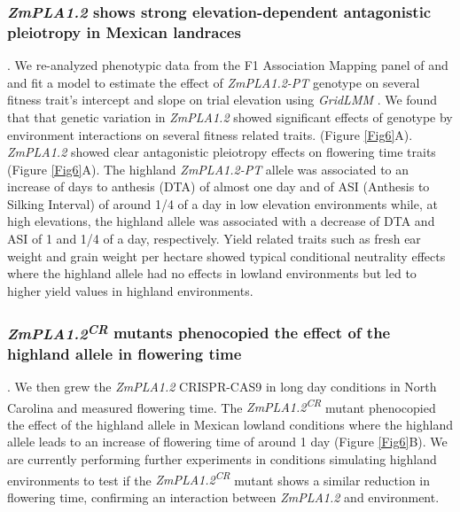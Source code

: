 \documentclass[9pt,twocolumn,twoside,lineno]{BioRxiv}
\begin{document}
\subsubsection{\textit{ZmPLA1.2} shows strong elevation-dependent antagonistic pleiotropy in Mexican landraces}. 
We re-analyzed phenotypic data from the F1 Association Mapping panel of \cite{Romero_Navarro2017-cn} and \cite{Gates2019-xu} and fit a model to estimate the effect of \textit{ZmPLA1.2-PT} genotype on several fitness trait's intercept and slope on trial elevation using \textit{GridLMM} \cite{Runcie2019-Gr}. 
We found that that genetic variation in \textit{ZmPLA1.2} showed significant effects of genotype by environment interactions on several fitness related traits. (Figure \ref{Fig6}A). 
\textit{ZmPLA1.2} showed clear antagonistic pleiotropy effects on flowering time traits (Figure \ref{Fig6}A). 
The highland \textit{ZmPLA1.2-PT} allele was associated to an increase of days to anthesis (DTA) of almost one day and of ASI (Anthesis to Silking Interval) of around 1/4 of a day in low elevation environments while, at high elevations, the highland allele was associated with a decrease of DTA and ASI of 1 and 1/4 of a day, respectively.
Yield related traits such as fresh ear weight and grain weight per hectare showed typical conditional neutrality effects where the highland allele had no effects in lowland environments but led to higher yield values in highland environments.
\subsubsection{\textit{ZmPLA1.2\textsuperscript{CR}} mutants phenocopied the effect of the highland allele in flowering time}.
We then grew the \textit{ZmPLA1.2} CRISPR-CAS9 in long day conditions in North Carolina and measured flowering time. 
The \textit{ZmPLA1.2\textsuperscript{CR}} mutant phenocopied the effect of the highland allele in Mexican lowland conditions where the highland allele leads to an increase of flowering time of around 1 day (Figure \ref{Fig6}B). 
We are currently performing further experiments in conditions simulating highland environments to test if the \textit{ZmPLA1.2\textsuperscript{CR}} mutant shows a similar reduction in flowering time, confirming an interaction between \textit{ZmPLA1.2} and environment.
\end{document}
